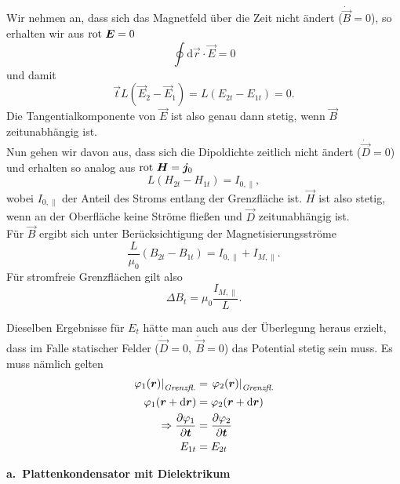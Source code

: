 Wir nehmen an, dass sich das Magnetfeld über die Zeit nicht ändert ($\dot{\vec{B}}=0$), so erhalten wir aus $\text{rot } \bm{E} = 0$
\begin{equation*}
\oint\mathrm{d}\vec{r}\cdot\vec{E} = 0 
\end{equation*}
und damit
\begin{equation*}
\vec{t}L(\vec{E}_2-\vec{E}_1)=L(E_{2t}-E_{1t})=0.
\end{equation*}
Die Tangentialkomponente von $\vec{E}$ ist also genau dann stetig, wenn $\vec{B}$ zeitunabhängig ist. \\

Nun gehen wir davon aus, dass sich die Dipoldichte zeitlich nicht ändert ($\dot{\vec{D}}=0$) und erhalten so analog aus $\text{rot } \bm{H}=\bm{j}_0$
\begin{equation*}
L(H_{2t}-H_{1t})=I_{0,\parallel},
\end{equation*}
wobei $I_{0,\parallel}$ der Anteil des Stroms entlang der Grenzfläche ist. $\vec{H}$ ist also stetig, wenn an der Oberfläche keine Ströme fließen und $\vec{D}$ zeitunabhängig ist.\\
Für $\vec{B}$ ergibt sich unter Berücksichtigung der Magnetisierungsströme
\begin{equation*}
\frac{L}{\mu_0}(B_{2t}-B_{1t})=I_{0,\parallel}+I_{M,\parallel}.
\end{equation*}
Für stromfreie Grenzflächen gilt also
\begin{equation*}
\Delta B_{t} = \mu_0\frac{I_{M,\parallel}}{L}.
\end{equation*}

Dieselben Ergebnisse für $E_t$ hätte man auch aus der Überlegung heraus erzielt, dass im Falle statischer Felder ($\dot{\vec{D}}=0,\ \dot{\vec{B}}=0$) das Potential stetig sein muss. Es muss nämlich gelten
\begin{align*}
\left.\varphi_1(\bm{r})\right|_\textit{Grenzfl.} &= \left.\varphi_2(\bm{r})\right|_\textit{Grenzfl.}\\
\varphi_1(\bm{r}+\mathrm{d}\bm{r}) &=\varphi_2(\bm{r}+\mathrm{d}\bm{r})	\\
\Rightarrow
\frac{\partial{\varphi_1}}{\partial{\bm{t}}} &=\frac{\partial{\varphi_2}}{\partial{\bm{t}}}\\
E_{1t} &= E_{2t}
\end{align*}

\textbf{a.\ Plattenkondensator mit Dielektrikum}\\

